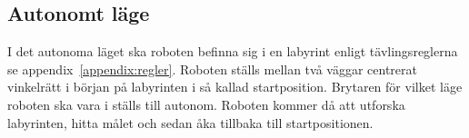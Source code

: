 \documentclass[11pt]{article}
\begin{document}
\subsection{Autonomt läge}
I det autonoma läget ska roboten befinna sig i en labyrint enligt tävlingsreglerna se appendix~\ref{appendix:regler}. Roboten ställs mellan två väggar centrerat vinkelrätt i början på labyrinten i så kallad startposition. Brytaren för vilket läge roboten ska vara i ställs till autonom. Roboten kommer då att utforska labyrinten, hitta målet och sedan åka tillbaka till startpositionen.





\printbibliography 

\pagebreak	



	
\end{document}
